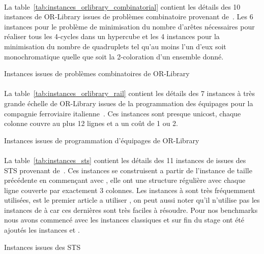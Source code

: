 \documentclass[a4paper,11pt,twoside,french,report]{../common/simplem}
\begin{document}
				\paragraph*{}
					La table~\ref{tab:instances_orlibrary_combinatorial} contient les détails des 10 instances de OR-Library issues de problèmes combinatoire provenant de~\cite{Grossman1997}. Les 6 instances  pour le problème de minimisation du nombre d'arêtes nécessaires pour réaliser tous les 4-cycles dans un hypercube et les 4 instances  pour la minimisation du nombre de quadruplets tel qu'au moins l'un d'eux soit monochromatique quelle que soit la 2-coloration d'un ensemble donné.
				\begin{table}[H]
					\centering
					\caption{Instances issues de problèmes combinatoires de OR-Library}
					\label{tab:instances_orlibrary_combinatorial}
					
				\end{table}
				\paragraph*{}
					La table~\ref{tab:instances_orlibrary_rail} contient les détails des 7 instances à très grande échelle de OR-Library issues de la programmation des équipages pour la compagnie ferroviaire italienne~\cite{Caprara2000}. Ces instances sont presque unicost, chaque colonne couvre au plus 12 lignes et a un coût de 1 ou 2.
				\begin{table}[H]
					\centering
					\caption{Instances issues de programmation d'équipages de OR-Library}
					\label{tab:instances_orlibrary_rail}
					
				\end{table}
				\paragraph*{}
					La table~\ref{tab:instances_sts} contient les détails des 11 instances de issues des \gls{STS} provenant de~\cite{Fulkerson1974}. Ces instances se construisent a partir de l'instance de taille précédente en commençant avec , elle ont une structure régulière avec chaque ligne couverte par exactement 3 colonnes. Les instances  à  sont très fréquemment utilisées, \cite{Gao2015} est le premier article a utiliser , on peut aussi noter qu'il n'utilise pas les instances de  à  car ces dernières sont très faciles à résoudre. Pour nos benchmarks nous avons commencé avec les instances classiques et sur fin du stage ont été ajoutés les instances  et .
				\begin{table}[H]
					\centering
					\caption{Instances issues des \acrshort{STS}}
					\label{tab:instances_sts}
					
				\end{table}
\end{document}
